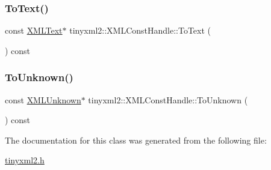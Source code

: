 \mbox{\label{classtinyxml2_1_1_x_m_l_const_handle_a80e24d90d476005aa35602a665358e2d}} 
\subsubsection{\texorpdfstring{To\+Text()}{ToText()}}
{\footnotesize\ttfamily const \mbox{\hyperlink{classtinyxml2_1_1_x_m_l_text}{X\+M\+L\+Text}}$\ast$ tinyxml2\+::\+X\+M\+L\+Const\+Handle\+::\+To\+Text (\begin{DoxyParamCaption}{ }\end{DoxyParamCaption}) const\hspace{0.3cm}{\ttfamily [inline]}}

\mbox{\label{classtinyxml2_1_1_x_m_l_const_handle_a4395e5feaba7b456a81ca274880ea3d3}} 
\subsubsection{\texorpdfstring{To\+Unknown()}{ToUnknown()}}
{\footnotesize\ttfamily const \mbox{\hyperlink{classtinyxml2_1_1_x_m_l_unknown}{X\+M\+L\+Unknown}}$\ast$ tinyxml2\+::\+X\+M\+L\+Const\+Handle\+::\+To\+Unknown (\begin{DoxyParamCaption}{ }\end{DoxyParamCaption}) const\hspace{0.3cm}{\ttfamily [inline]}}



The documentation for this class was generated from the following file\+:\begin{DoxyCompactItemize}
\item 
\mbox{\hyperlink{tinyxml2_8h}{tinyxml2.\+h}}\end{DoxyCompactItemize}
